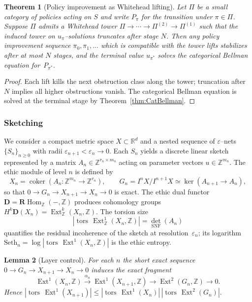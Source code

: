 \documentclass[12pt]{article}
\newcommand{\tors}{\operatorname{tors}}
\newcommand{\RR}{\mathbb{R}}
\newcommand{\ZZ}{\mathbb{Z}}
\newcommand{\Ext}{\operatorname{Ext}}
\newcommand{\RHom}{\mathbf{R}\!\operatorname{Hom}}
\theoremstyle{plain}
\newtheorem{theorem}{Theorem}[section]
\newtheorem{lemma}[theorem]{Lemma}
\theoremstyle{definition}
\theoremstyle{remark}
\numberwithin{equation}{section}
\begin{document}
\begin{theorem}[Policy improvement as Whitehead lifting]
Let $\Pi$ be a small category of policies acting on $S$ and write $P_\pi$ for the transition under $\pi\in \Pi$. Suppose $\Pi$ admits a Whitehead tower $\Pi\to \cdots \to \Pi^{(2)}\to \Pi^{(1)}$ such that the induced tower on $u_\pi$–solutions truncates after stage $N$. Then any policy improvement sequence $\pi_0,\pi_1,\dots$ which is compatible with the tower lifts stabilizes after at most $N$ stages, and the terminal value $u_{\pi^\ast}$ solves the categorical Bellman equation for~$P_{\pi^\ast}$.\cite{Whitehead1949,Postnikov1952}
\end{theorem}

\begin{proof}
Each lift kills the next obstruction class along the tower; truncation after $N$ implies all higher obstructions vanish. The categorical Bellman equation is solved at the terminal stage by Theorem~\ref{thm:CatBellman}.
\end{proof}

\subsubsection{Sketching}

We consider a compact metric space \(X\subset \RR^d\) and a nested sequence of $\varepsilon$–nets
\(\{S_n\}_{n\ge0}\) with radii $\varepsilon_{n+1}<\varepsilon_n\to0$.
Each $S_n$ yields a discrete linear sketch represented by a matrix
\(A_n\in\ZZ^{r_n\times m_n}\) acting on parameter vectors $u\in\ZZ^{m_n}$.
The ethic module of level $n$ is defined by
\[
X_n=\operatorname{coker}(A_n:\ZZ^{m_n}\!\to\!\ZZ^{r_n}),\qquad
G_n=I^nX/I^{n+1}X\simeq \ker(A_{n+1}\!\to\!A_n),
\]
so that \(0\to G_n\to X_{n+1}\to X_n\to0\) is exact.
The ethic dual functor \(\mathbf D=\RHom_\ZZ(-,\ZZ)\) produces cohomology groups
\(H^k\mathbf D(X_n)=\Ext^k_\ZZ(X_n,\ZZ)\).
The torsion size
\[
|\tors\,\Ext^1_\ZZ(X_n,\ZZ)|=\det_{\text{SNF}}(A_n)
\]
quantifies the residual incoherence of the sketch at resolution~$\varepsilon_n$;
its logarithm $\mathrm{Seth}_n=\log|\tors\,\Ext^1(X_n,\ZZ)|$ is the ethic entropy.

\begin{lemma}[Layer control]\label{lem:layer-eps}
For each $n$ the short exact sequence
$0\to G_n\to X_{n+1}\to X_n\to0$
induces the exact fragment
\[
\Ext^1(X_n,\ZZ)\xrightarrow{\alpha_n}\Ext^1(X_{n+1},\ZZ)
\longrightarrow \Ext^2(G_n,\ZZ)\longrightarrow0.
\]
Hence
\(
|\tors\,\Ext^1(X_{n+1})|
 \le |\tors\,\Ext^1(X_n)|\,
 |\tors\,\Ext^2(G_n)|.
\)
\end{lemma}
\end{document}
